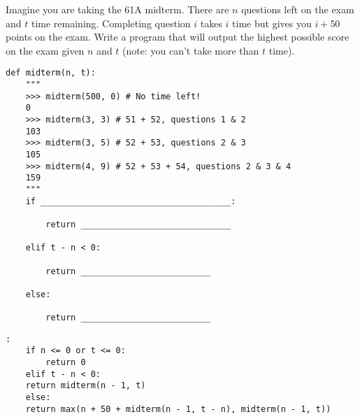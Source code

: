\begin{blocksection}
\question Imagine you are taking the 61A midterm. There are $n$ questions left on the exam and $t$ time remaining. Completing question $i$ takes $i$ time but gives you $i + 50$ points on the exam. Write a program that will output the highest possible score on the exam given $n$ and $t$ (note: you can't take more than $t$ time). \\

\begin{lstlisting}
def midterm(n, t):
    """
    >>> midterm(500, 0) # No time left!
    0 
    >>> midterm(3, 3) # 51 + 52, questions 1 & 2
    103
    >>> midterm(3, 5) # 52 + 53, questions 2 & 3
    105 
    >>> midterm(4, 9) # 52 + 53 + 54, questions 2 & 3 & 4
    159
    """		
    if ______________________________________:		

        return ______________________________	

    elif t - n < 0:	

        return __________________________	

    else:

        return __________________________
\end{lstlisting}

\begin{solution}[1in]
\begin{lstlisting}:
    if n <= 0 or t <= 0:
        return 0
    elif t - n < 0:
	return midterm(n - 1, t)
    else:
	return max(n + 50 + midterm(n - 1, t - n), midterm(n - 1, t))
\end{lstlisting}
\end{solution}
\end{blocksection}
